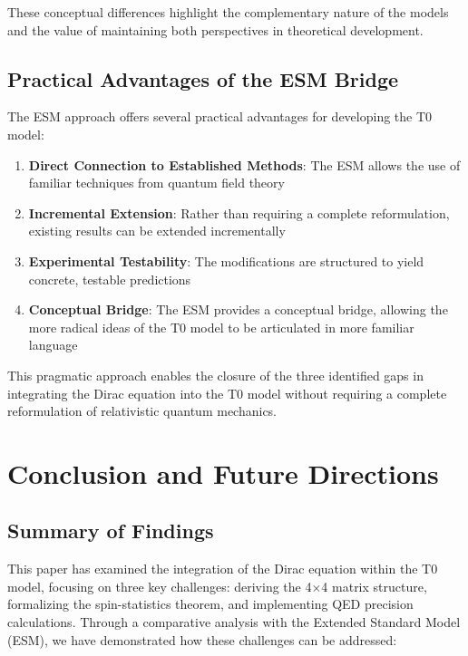 \documentclass[12pt,a4paper]{article}
\begin{document}
	These conceptual differences highlight the complementary nature of the models and the value of maintaining both perspectives in theoretical development.
	
	\subsection{Practical Advantages of the ESM Bridge}
	\label{subsec:practical_advantages}
	
	The ESM approach offers several practical advantages for developing the T0 model:
	
	\begin{enumerate}
		\item \textbf{Direct Connection to Established Methods}: The ESM allows the use of familiar techniques from quantum field theory
		\item \textbf{Incremental Extension}: Rather than requiring a complete reformulation, existing results can be extended incrementally
		\item \textbf{Experimental Testability}: The modifications are structured to yield concrete, testable predictions
		\item \textbf{Conceptual Bridge}: The ESM provides a conceptual bridge, allowing the more radical ideas of the T0 model to be articulated in more familiar language
	\end{enumerate}
	
	This pragmatic approach enables the closure of the three identified gaps in integrating the Dirac equation into the T0 model without requiring a complete reformulation of relativistic quantum mechanics.
	
	\section{Conclusion and Future Directions}
	\label{sec:conclusion}
	
	\subsection{Summary of Findings}
	\label{subsec:summary}
	
	This paper has examined the integration of the Dirac equation within the T0 model, focusing on three key challenges: deriving the 4$\times$4 matrix structure, formalizing the spin-statistics theorem, and implementing QED precision calculations. Through a comparative analysis with the Extended Standard Model (ESM), we have demonstrated how these challenges can be addressed:
	
\end{document}
